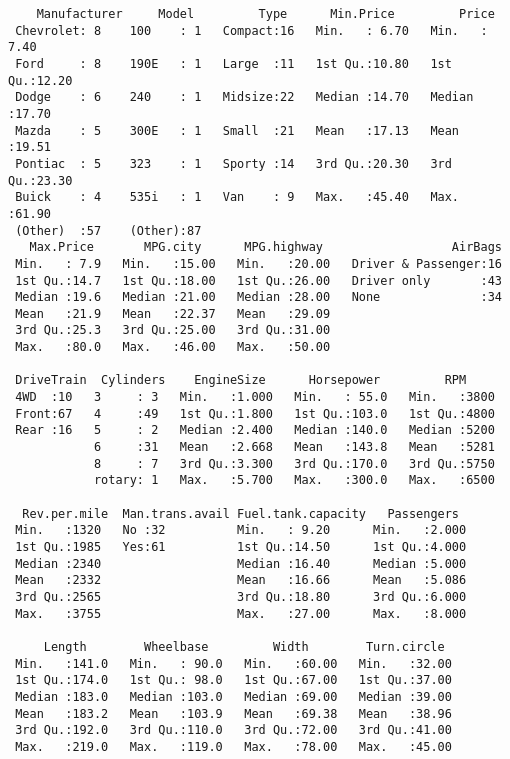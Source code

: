 \documentclass[11pt]{article}
\begin{document}
    
    \begin{verbatim}
    Manufacturer     Model         Type      Min.Price         Price      
 Chevrolet: 8    100    : 1   Compact:16   Min.   : 6.70   Min.   : 7.40  
 Ford     : 8    190E   : 1   Large  :11   1st Qu.:10.80   1st Qu.:12.20  
 Dodge    : 6    240    : 1   Midsize:22   Median :14.70   Median :17.70  
 Mazda    : 5    300E   : 1   Small  :21   Mean   :17.13   Mean   :19.51  
 Pontiac  : 5    323    : 1   Sporty :14   3rd Qu.:20.30   3rd Qu.:23.30  
 Buick    : 4    535i   : 1   Van    : 9   Max.   :45.40   Max.   :61.90  
 (Other)  :57    (Other):87                                               
   Max.Price       MPG.city      MPG.highway                  AirBags  
 Min.   : 7.9   Min.   :15.00   Min.   :20.00   Driver & Passenger:16  
 1st Qu.:14.7   1st Qu.:18.00   1st Qu.:26.00   Driver only       :43  
 Median :19.6   Median :21.00   Median :28.00   None              :34  
 Mean   :21.9   Mean   :22.37   Mean   :29.09                          
 3rd Qu.:25.3   3rd Qu.:25.00   3rd Qu.:31.00                          
 Max.   :80.0   Max.   :46.00   Max.   :50.00                          
                                                                       
 DriveTrain  Cylinders    EngineSize      Horsepower         RPM      
 4WD  :10   3     : 3   Min.   :1.000   Min.   : 55.0   Min.   :3800  
 Front:67   4     :49   1st Qu.:1.800   1st Qu.:103.0   1st Qu.:4800  
 Rear :16   5     : 2   Median :2.400   Median :140.0   Median :5200  
            6     :31   Mean   :2.668   Mean   :143.8   Mean   :5281  
            8     : 7   3rd Qu.:3.300   3rd Qu.:170.0   3rd Qu.:5750  
            rotary: 1   Max.   :5.700   Max.   :300.0   Max.   :6500  
                                                                      
  Rev.per.mile  Man.trans.avail Fuel.tank.capacity   Passengers   
 Min.   :1320   No :32          Min.   : 9.20      Min.   :2.000  
 1st Qu.:1985   Yes:61          1st Qu.:14.50      1st Qu.:4.000  
 Median :2340                   Median :16.40      Median :5.000  
 Mean   :2332                   Mean   :16.66      Mean   :5.086  
 3rd Qu.:2565                   3rd Qu.:18.80      3rd Qu.:6.000  
 Max.   :3755                   Max.   :27.00      Max.   :8.000  
                                                                  
     Length        Wheelbase         Width        Turn.circle   
 Min.   :141.0   Min.   : 90.0   Min.   :60.00   Min.   :32.00  
 1st Qu.:174.0   1st Qu.: 98.0   1st Qu.:67.00   1st Qu.:37.00  
 Median :183.0   Median :103.0   Median :69.00   Median :39.00  
 Mean   :183.2   Mean   :103.9   Mean   :69.38   Mean   :38.96  
 3rd Qu.:192.0   3rd Qu.:110.0   3rd Qu.:72.00   3rd Qu.:41.00  
 Max.   :219.0   Max.   :119.0   Max.   :78.00   Max.   :45.00  
                                                                

\end{verbatim}
\end{document}
